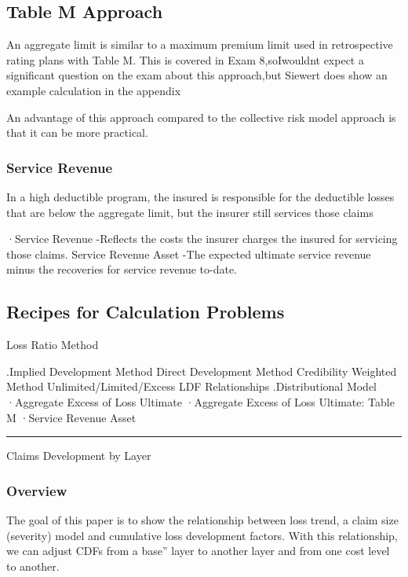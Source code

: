 \documentclass[
]{article}
\begin{document}
\subsection{Table M Approach}\label{table-m-approach}

An aggregate limit is similar to a maximum premium limit used in
retrospective rating plans with Table M. This is covered in Exam
8,soIwouldnt expect a significant question on the exam about this
approach,but Siewert does show an example calculation in the appendix

An advantage of this approach compared to the collective risk model
approach is that it can be more practical.

\subsubsection{Service Revenue}\label{service-revenue}

In a high deductible program, the insured is responsible for the
deductible losses that are below the aggregate limit, but the insurer
still services those claims

·Service Revenue -Reflects the costs the insurer charges the insured for
servicing those claims. Service Revenue Asset -The expected ultimate
service revenue minus the recoveries for service revenue to-date.

\subsection{Recipes for Calculation
Problems}\label{recipes-for-calculation-problems-7}

Loss Ratio Method

.Implied Development Method Direct Development Method Credibility
Weighted Method Unlimited/Limited/Excess LDF Relationships
.Distributional Model ·Aggregate Excess of Loss Ultimate ·Aggregate
Excess of Loss Ultimate: Table M ·Service Revenue Asset

\begin{center}\rule{0.5\linewidth}{0.5pt}\end{center}

Claims Development by Layer

\subsubsection{Overview}\label{overview-8}

The goal of this paper is to show the relationship between loss trend, a
claim size (severity) model and cumulative loss development factors.
With this relationship, we can adjust CDFs from a base'' layer to
another layer and from one cost level to another.
\end{document}
